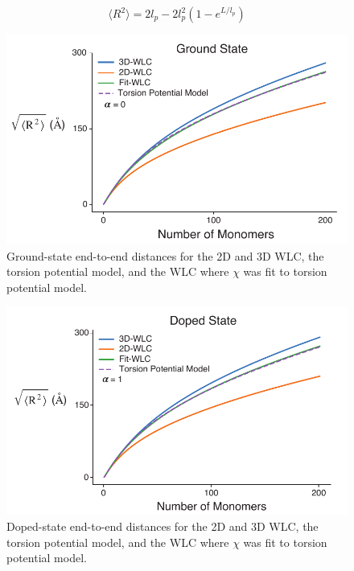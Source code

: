 \begin{equation}
\Big\langle R^2 \Big\rangle = 2l_p - 2l_p^2 \left(1 - e^{L/l_p} \right)
\label{eq:wlc_msqr}
\end{equation}

\begin{figure}[hbt!]
    \centering
    \includegraphics{figures/append_tor_model/gs_wlc_fit.pdf}
    \caption[Ground-state End-to-end Distance of the 2D-WLC, 3D-WLC, Torsion Potential Model, and Fit-WLC]{Ground-state end-to-end distances for the 2D and 3D WLC, the torsion potential model, and the WLC where $\chi$ was fit to torsion potential model.}
    \label{fig:gs_wlc}
\end{figure}

\begin{figure}[hbt!]
    \centering
    \includegraphics{figures/append_tor_model/cat_wlc_fit.pdf}
    \caption[Doped-state End-to-end Distance of the 2D-WLC, 3D-WLC, Torsion Potential Model, and Fit-WLC]{Doped-state end-to-end distances for the 2D and 3D WLC, the torsion potential model, and the WLC where $\chi$ was fit to torsion potential model.}
    \label{fig:d_wlc}
\end{figure}

